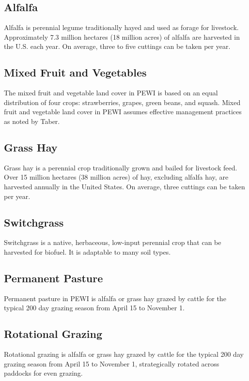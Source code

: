 \documentclass[11pt]{article}
\begin{document}
\subsection{Alfalfa}
Alfalfa is perennial legume traditionally hayed and used as forage for livestock. Approximately 7.3 million hectares (18 million acres) of alfalfa are harvested in the U.S. each year\cite{5}.  On average, three to five cuttings can be taken per year.

\subsection{Mixed Fruit and Vegetables}
The mixed fruit and vegetable land cover in PEWI is based on an equal distribution of four crops: strawberries, grapes, green beans, and squash. Mixed fruit and vegetable land cover in PEWI assumes effective management practices as noted by Taber.

\subsection{Grass Hay}
Grass hay is a perennial crop traditionally grown and bailed for livestock feed. Over 15 million hectares (38 million acres) of hay, excluding alfalfa hay, are harvested annually in the United States. On average, three cuttings can be taken per year. 

\subsection{Switchgrass}
Switchgrass is a native, herbaceous, low-input perennial crop that can be harvested for biofuel. It is adaptable to many soil types.

\subsection{Permanent Pasture}
Permanent pasture in PEWI is alfalfa or grass hay grazed by cattle for the typical 200 day grazing season from April 15 to November 1.\cite{10}

\subsection{Rotational Grazing}
Rotational grazing is alfalfa or grass hay grazed by cattle for the typical 200 day grazing season from April 15 to November 1, strategically rotated across paddocks for even grazing.\cite{11}
\end{document}
